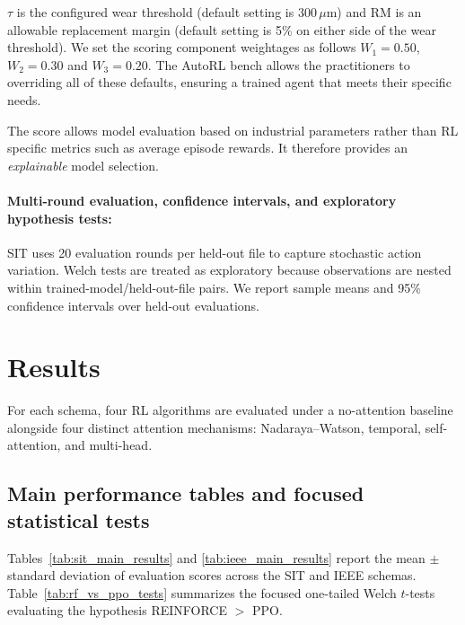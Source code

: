 \documentclass[sn-basic]{sn-jnl}%
\begin{document}
$\tau$ is the configured wear threshold (default setting is $300\,\mu\mathrm{m}$) and $\mathrm{RM}$ is an allowable replacement margin (default setting is 5\% on either side of the wear threshold). We set the scoring component weightages as follows $W_1 = 0.50$, $W_2 = 0.30$ and $W_3 = 0.20$. The AutoRL bench allows the practitioners to overriding all of these defaults, ensuring a trained agent that meets their specific needs. 

The score allows model evaluation based on industrial parameters rather than RL specific metrics such as average episode rewards. It therefore provides an \emph{explainable} model selection.  

\paragraph{Multi-round evaluation, confidence intervals, and exploratory hypothesis tests:}
SIT uses 20 evaluation rounds per held-out file to capture stochastic action variation. Welch tests are treated as exploratory because observations are nested within trained-model/held-out-file pairs. We report sample means and 95\% confidence intervals over held-out evaluations.

\section{Results} \label{sec:results}
For each schema, four RL algorithms are evaluated under a no-attention baseline alongside four distinct attention mechanisms: Nadaraya--Watson, temporal, self-attention, and multi-head.

\subsection{Main performance tables and focused statistical tests}
\label{sec:hypothesis_tests}

Tables~\ref{tab:sit_main_results} and \ref{tab:ieee_main_results} report the mean $\pm$ standard deviation of evaluation scores across the SIT and IEEE schemas. Table~\ref{tab:rf_vs_ppo_tests} summarizes the focused one-tailed Welch $t$-tests evaluating the hypothesis \textsc{REINFORCE} $>$ \textsc{PPO}. 
\end{document}

